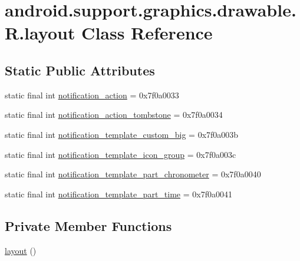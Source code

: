 \hypertarget{classandroid_1_1support_1_1graphics_1_1drawable_1_1_r_1_1layout}{}\section{android.\+support.\+graphics.\+drawable.\+R.\+layout Class Reference}
\label{classandroid_1_1support_1_1graphics_1_1drawable_1_1_r_1_1layout}
\subsection*{Static Public Attributes}
\begin{DoxyCompactItemize}
\item 
static final int \mbox{\hyperlink{classandroid_1_1support_1_1graphics_1_1drawable_1_1_r_1_1layout_a8c635c00891f90c0a7021c4643c79d10}{notification\+\_\+action}} = 0x7f0a0033
\item 
static final int \mbox{\hyperlink{classandroid_1_1support_1_1graphics_1_1drawable_1_1_r_1_1layout_a6a02543ca15d3b112916f168117797cf}{notification\+\_\+action\+\_\+tombstone}} = 0x7f0a0034
\item 
static final int \mbox{\hyperlink{classandroid_1_1support_1_1graphics_1_1drawable_1_1_r_1_1layout_a915e2f61869cd92504f89d23e8103f8a}{notification\+\_\+template\+\_\+custom\+\_\+big}} = 0x7f0a003b
\item 
static final int \mbox{\hyperlink{classandroid_1_1support_1_1graphics_1_1drawable_1_1_r_1_1layout_a20955748ee8168fb8ea82f1147421575}{notification\+\_\+template\+\_\+icon\+\_\+group}} = 0x7f0a003c
\item 
static final int \mbox{\hyperlink{classandroid_1_1support_1_1graphics_1_1drawable_1_1_r_1_1layout_ab27345b5d740a94a73736a05f2650143}{notification\+\_\+template\+\_\+part\+\_\+chronometer}} = 0x7f0a0040
\item 
static final int \mbox{\hyperlink{classandroid_1_1support_1_1graphics_1_1drawable_1_1_r_1_1layout_a0e956654a5b88f1e4236cf0f3b58eeb6}{notification\+\_\+template\+\_\+part\+\_\+time}} = 0x7f0a0041
\end{DoxyCompactItemize}
\subsection*{Private Member Functions}
\begin{DoxyCompactItemize}
\item 
\mbox{\hyperlink{classandroid_1_1support_1_1graphics_1_1drawable_1_1_r_1_1layout_a634482dadf0d30eae8b518748aed3c8f}{layout}} ()
\end{DoxyCompactItemize}


